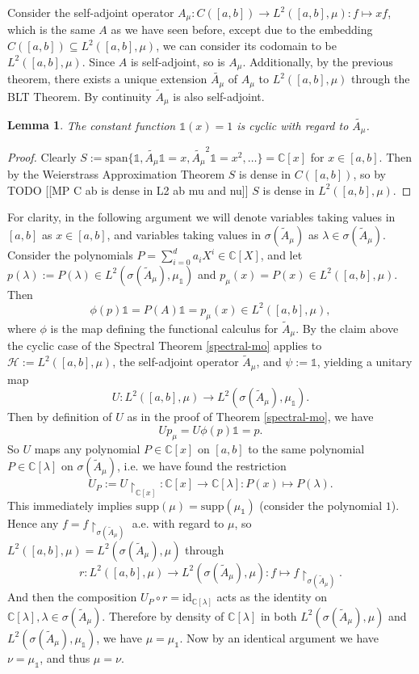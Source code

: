 \documentclass[12pt,oneside]{report}
\newtheorem{lem}[thm]{Lemma}
\begin{document}
Consider the self-adjoint operator $A_{\mu}: C([a,b]) \to L^{2}([a,b],\mu): f \mapsto xf$, which is the same $A$ as we have seen before, except due to the embedding $C([a,b]) \subseteq L^{2}([a,b],\mu)$, we can consider its codomain to be $L^{2}([a,b],\mu)$. Since $A$ is self-adjoint, so is $A_{\mu}$. Additionally, by the previous theorem, there exists a unique extension $\tilde{A_{\mu}}$ of $A_{\mu}$ to $L^{2}([a,b],\mu)$ through the BLT Theorem. By continuity $\tilde{A}_{\mu}$ is also self-adjoint.

\begin{lem}
    The constant function $\mathds{1}(x) = 1$ is cyclic with regard to $\tilde{A_{\mu}}$.
\end{lem}
\begin{proof}
    Clearly $S := \text{span}\{ \mathds{1}, \tilde{A_{\mu}}\mathds{1} = x, \tilde{A_{\mu}}^{2}\mathds{1} = x^{2}, \dots \} = \mathbb{C}[x]$ for $x \in [a,b]$. Then by the Weierstrass Approximation Theorem $S$ is dense in $C([a,b])$, so by TODO [[MP C ab is dense in L2 ab mu and nu]] $S$ is dense in $L^{2}([a,b],\mu)$.
\end{proof}

For clarity, in the following argument we will denote variables taking values in $[a,b]$ as $x \in [a,b]$, and variables taking values in $\sigma(\tilde{A}_{\mu})$ as $\lambda \in \sigma(\tilde{A}_{\mu})$.
Consider the polynomials $P = \sum_{i=0}^{d}a_{i}X^{i} \in \mathbb{C}[X]$, and let $p(\lambda) := P(\lambda) \in L^{2}(\sigma(\tilde{A}_{\mu}), \mu_{\mathds{1}})$ and $p_{\mu}(x) = P(x) \in L^{2}([a,b],\mu)$.
Then
$$\phi(p)\mathds{1} = P(A)\mathds{1} = p_{\mu}(x) \in L^{2}([a,b], \mu),$$
where $\phi$ is the map defining the functional calculus for $\tilde{A}_{\mu}$.
By the claim above the cyclic case of the Spectral Theorem \ref{spectral-mo} applies to $\mathscr{H} := L^{2}([a,b],\mu)$, the self-adjoint operator $\tilde{A}_{\mu}$, and $\psi := \mathds{1}$, yielding a unitary map
$$U: L^{2}([a,b],\mu) \to L^{2}(\sigma(\tilde{A}_{\mu}),\mu_{\mathds{1}}).$$
Then by definition of $U$ as in the proof of Theorem \ref{spectral-mo}, we have
$$Up_{\mu} = U\phi(p)\mathds{1} = p.$$
So $U$ maps any polynomial $P \in \mathbb{C}[x]$ on $[a,b]$ to the same polynomial $P \in \mathbb{C}[\lambda]$ on $\sigma(\tilde{A}_{\mu})$, i.e. we have found the restriction
$$U_{P} := U \restriction_{\mathbb{C}[x]}: \mathbb{C}[x] \to \mathbb{C}[\lambda]: P(x) \mapsto P(\lambda).$$
This immediately implies $\text{supp}(\mu) = \text{supp}(\mu_{\mathds{1}})$ (consider the polynomial $1$). Hence any $f = f \restriction_{\sigma(\tilde{A}_{\mu})}$ a.e. with regard to $\mu$, so $L^{2}([a,b],\mu) = L^{2}(\sigma(\tilde{A}_{\mu}),\mu)$ through
$$r: L^{2}([a,b],\mu) \to L^{2}(\sigma(\tilde{A}_{\mu}),\mu): f \mapsto f \restriction_{\sigma(\tilde{A}_{\mu})}.$$
And then the composition $U_{P} \circ r = \text{id}_{\mathbb{C}[\lambda]}$ acts as the identity on $\mathbb{C}[\lambda], \lambda \in \sigma(\tilde{A}_{\mu})$.
Therefore by density of $\mathbb{C}[\lambda]$ in both $L^{2}(\sigma(\tilde{A}_{\mu}),\mu)$ and $L^{2}(\sigma(\tilde{A}_{\mu}),\mu_{\mathds{1}})$, we have $\mu = \mu_{\mathds{1}}$.
Now by an identical argument we have $\nu = \mu_{\mathds{1}}$, and thus $\mu = \nu$.
\end{document}

